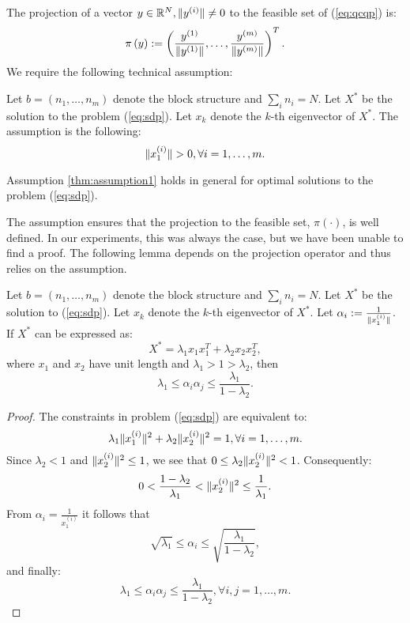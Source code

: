 The projection of a vector $y \in \mathbb{R}^N, \lVert y^{(i)}\rVert \neq 0$ to the feasible set of (\ref{eq:qcqp}) is:
$$\pi\left(y\right) := \left(\frac{y^{(1)}}{\lVert y^{(1)}\rVert}, \ldots, \frac{y^{(m)}}{\lVert y^{(m)}\rVert}\right)^T.$$
We require the following technical assumption:
\begin{assumption}\label{thm:assumption1}
Let $b = \left(n_1,\ldots,n_m\right)$ denote the block structure and $ \sum_i n_i = N $.
Let $X^*$ be the solution to the problem (\ref{eq:sdp}). Let $x_k$ denote the $k$-th eigenvector of $X^*$.
The assumption is the following: $$\lVert x_1^{(i)}\rVert > 0, \forall i = 1,\ldots, m.$$
\end{assumption}
\begin{conjecture}\label{thm:conj1}
Assumption \ref{thm:assumption1} holds in general for optimal solutions to  the problem (\ref{eq:sdp}).
\end{conjecture}
The assumption ensures that the projection to the feasible set,
$\pi(\cdot)$, is  well defined. In our experiments, this was always
the case, but we have been unable to find a proof. %
The following lemma depends on the projection
operator and thus relies on the assumption.
%
\begin{lemma}
Let $b = \left(n_1,\ldots,n_m\right)$ denote the block structure and $ \sum_i n_i = N $.
Let $X^*$ be the solution to (\ref{eq:sdp}).
Let $x_k$ denote the $k$-th eigenvector of $X^*$.
Let $\alpha_i := \frac{1}{\lVert x_1^{(i)}\rVert}$.
If $X^*$ can be expressed as:
$$X^* = \lambda_1  x_1 x_1^T + \lambda_2 x_2 x_2^T,$$
where $x_1$ and $x_2$ have unit length and $\lambda_1 > 1 >  \lambda_2$, then
$$\lambda_1 \leq \alpha_i \alpha_j  \leq \frac{\lambda_1}{1 - \lambda_2}.$$
\end{lemma}
%
\begin{proof}
The constraints in problem (\ref{eq:sdp}) are equivalent to:
$$\lambda_1 \lVert x_1^{(i)}\rVert^2 + \lambda_2 \lVert x_2^{(i)}\rVert^2 = 1, \forall i = 1,\ldots, m.$$
Since $\lambda_2 < 1$ and $\lVert x_2^{(i)}\rVert^2 \leq 1$, we see that $0 \leq \lambda_2 \lVert x_2^{(i)}\rVert^2  < 1$.
Consequently:
$$  0 < \frac{1- \lambda_2}{\lambda_1} < \lVert x_2^{(i)}\rVert^2 \leq \frac{1}{\lambda_1}.$$
From $\alpha_i = \frac{1}{x_1^{(i)}}$ it follows that $$ \sqrt{\lambda_1} \leq \alpha_i \leq \sqrt{\frac{\lambda_1}{1-\lambda_2}},$$
and finally:
$$ \lambda_1 \leq \alpha_i \alpha_j \leq \frac{\lambda_1}{1-\lambda_2}, \forall i,j = 1,\ldots,m.$$
\end{proof}
